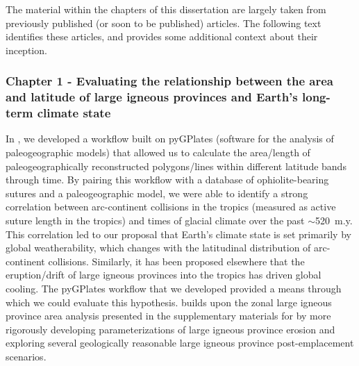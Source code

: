 \documentclass{ucbthesis}
\begin{document}
\begin{frontmatter}


\tableofcontents
\clearpage
\listoffigures
\clearpage
\listoftables


\begin{preface}

The material within the chapters of this dissertation are largely taken from previously published (or soon to be published) articles. The following text identifies these articles, and provides some additional context about their inception.

\subsubsection*{Chapter 1 - Evaluating the relationship between the area and latitude of large igneous provinces and Earth's long-term climate state}

\noindent
{}

\medskip

\noindent
{}

\medskip

In \citet{Macdonald2019a}, we developed a workflow built on pyGPlates (software for the analysis of paleogeographic models) that allowed us to calculate the area/length of paleogeographically reconstructed polygons/lines within different latitude bands through time. By pairing this workflow with a database of ophiolite-bearing sutures and a paleogeographic model, we were able to identify a strong correlation between arc-continent collisions in the tropics (measured as active suture length in the tropics) and times of glacial climate over the past $\sim$520~m.y. This correlation led to our proposal that Earth's climate state is set primarily by global weatherability, which changes with the latitudinal distribution of arc-continent collisions. Similarly, it has been proposed elsewhere that the eruption/drift of large igneous provinces into the tropics has driven global cooling. The pyGPlates workflow that we developed provided a means through which we could evaluate this hypothesis. \citet{Park2019a} builds upon the zonal large igneous province area analysis presented in the supplementary materials for \citet{Macdonald2019a} by more rigorously developing parameterizations of large igneous province erosion and exploring several geologically reasonable large igneous province post-emplacement scenarios.


\end{preface}
\end{frontmatter}
\end{document}
